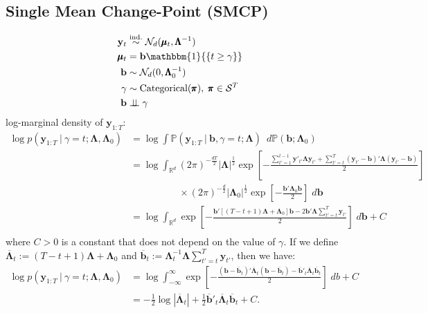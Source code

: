 \documentclass{article}
\newcommand\indep{\perp\!\!\!\perp}
\renewcommand{\Pr}{\mathbb{P}}
\begin{document}
\subsection{Single Mean Change-Point (SMCP)}



\label{sec:smcp}

\begin{align} \label{eq:smcp-start}
    \mathbf{y}_t &\overset{\text{ind.}}{\sim} \mathcal{N}_d(\pmb{\mu}_t, \pmb{\Lambda}^{-1}) \\
    \pmb{\mu}_t &= \mathbf{b}\mathbbm{1}{\left\{t\geq \gamma \right\}} \\
    \mathbf{b} &\sim \mathcal{N}_d(0,\pmb{\Lambda}_0^{-1}) \\
    \gamma &\sim \text{Categorical}(\pmb{\pi}),\; \pmb{\pi} \in \mathcal{S}^T \\
    \mathbf{b} &\indep \gamma
    \label{eq:smcp-end}
\end{align}
log-marginal density of $\mathbf{y}_{1:T}$: 
\begin{align*}
    \log p(\mathbf{y}_{1:T} \:|\:\gamma = t ; \pmb{\Lambda}, \pmb{\Lambda}_0) &= \log \int \Pr(\mathbf{y}_{1:T} \:|\:\mathbf{b},\gamma = t; \pmb{\Lambda}) \:\; d\Pr(\mathbf{b};\pmb{\Lambda}_0) \\
    &= \log \int_{\mathbb{R}^d} (2\pi)^{-\frac{dT}{2}}|\pmb{\Lambda}|^\frac{1}{2} \exp\left[-\frac{\sum_{t'=1}^{t-1} \mathbf{y}'_{t'}\pmb{\Lambda}\mathbf{y}_{t'} + \sum_{t'=t}^{T} (\mathbf{y}_{t'} - \mathbf{b})'\pmb{\Lambda}(\mathbf{y}_{t'} - \mathbf{b})}{2}\right] \\
    &\quad\quad\quad\quad\quad\times (2\pi)^{-\frac{d}{2}}|\pmb{\Lambda}_0|^\frac{1}{2}\exp\left[-\frac{\mathbf{b}'\pmb{\Lambda}_0 \mathbf{b}}{2}\right] \; d\mathbf{b} \\
    &= \log\int_{\mathbb{R}^d} \exp\left[-\frac{\mathbf{b}'[(T-t+1)\pmb{\Lambda} + \pmb{\Lambda}_0]\mathbf{b}-2\mathbf{b}'\pmb{\Lambda} \sum_{t'=t}^T\mathbf{y}_{t'}}{2}\right] \; d\mathbf{b} + C\\ 
\end{align*}
where $C>0$ is a constant that does not depend on the value of $\gamma$. If we define $\overline{\pmb{\Lambda}}_t := (T-t+1)\pmb{\Lambda} + \pmb{\Lambda}_0$ and $\overline{\mathbf{b}}_t := \pmb{\Lambda}^{-1}_t \pmb{\Lambda} \sum_{t'=t}^T \mathbf{y}_{t'}$, then we have:
\begin{align*}
    \log p(\mathbf{y}_{1:T} \:|\:\gamma = t ; \pmb{\Lambda}, \pmb{\Lambda}_0)
    &= \log \int_{-\infty}^\infty \exp\left[-\frac{(\mathbf{b} - \overline{\mathbf{b}}_t)'\overline{\pmb{\Lambda}}_t(\mathbf{b} - \overline{\mathbf{b}}_t) - \overline{\mathbf{b}}'_t \overline{\pmb{\Lambda}}_t \overline{\mathbf{b}}_t }{2}\right] \; db + C\\
    &= -\frac{1}{2}\log |\overline{\pmb{\Lambda}}_t| + \frac{1}{2} \overline{\mathbf{b}}'_t \overline{\pmb{\Lambda}}_t \overline{\mathbf{b}}_t + C.
\end{align*}
\end{document}

